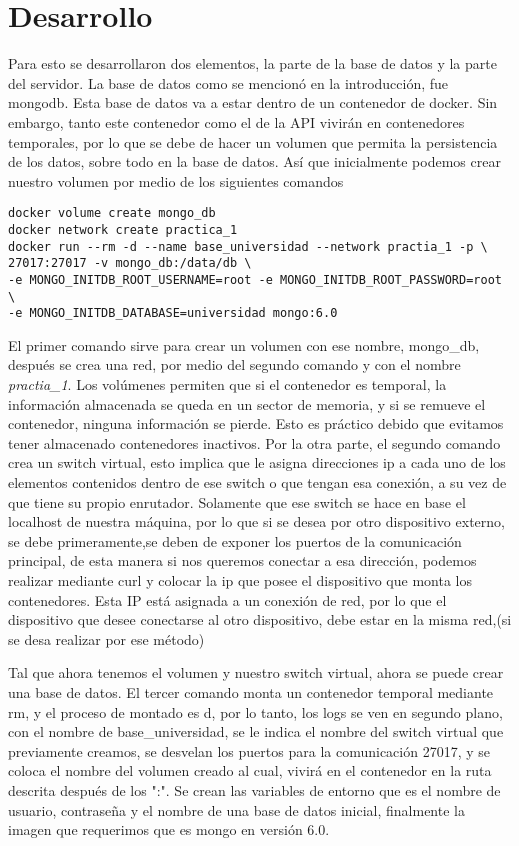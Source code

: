 \documentclass[12pt,a4paper]{report}
\begin{document}
\chapter{Desarrollo}
Para esto se desarrollaron dos elementos, la parte de la base de datos y la parte del servidor. La base de datos como se mencionó en la introducción, fue mongodb. Esta base de datos va a estar dentro de un contenedor de docker. Sin embargo, tanto este contenedor como el de la API vivirán en contenedores temporales, por lo que se debe de hacer un volumen que permita la persistencia de los datos, sobre todo en la base de datos. Así que inicialmente podemos crear nuestro  volumen por medio de los siguientes comandos
\begin{verbatim}
docker volume create mongo_db
docker network create practica_1
docker run --rm -d --name base_universidad --network practia_1 -p \
27017:27017 -v mongo_db:/data/db \
-e MONGO_INITDB_ROOT_USERNAME=root -e MONGO_INITDB_ROOT_PASSWORD=root \
-e MONGO_INITDB_DATABASE=universidad mongo:6.0      
\end{verbatim}
El primer comando sirve para crear un volumen con ese nombre, mongo\_db, después se crea una red, por medio del segundo comando y con el nombre \textit{practia\_1}. Los volúmenes permiten que si el contenedor es temporal, la información almacenada se queda en un sector de memoria, y si se remueve el contenedor, ninguna información se pierde. Esto es práctico debido que evitamos tener almacenado contenedores inactivos. Por la otra parte, el segundo comando crea un switch virtual, esto implica que le asigna direcciones ip a cada uno de los elementos contenidos dentro de ese switch o que tengan esa conexión, a su vez de que tiene su propio enrutador. Solamente que ese switch se hace en base el localhost de nuestra máquina, por lo que si se desea por otro dispositivo externo, se debe primeramente,se deben de exponer los puertos de la comunicación principal, de esta manera si nos queremos conectar a esa dirección, podemos realizar mediante curl y colocar la ip que posee el dispositivo que monta los contenedores. Esta IP está asignada a un conexión de red, por lo que el dispositivo que desee conectarse al otro dispositivo, debe estar en la misma red,(si se desa realizar por ese método)

Tal que ahora tenemos el volumen y nuestro switch virtual, ahora se puede crear una base de datos.
El tercer comando monta un contenedor temporal mediante \-\-rm, y el proceso de montado es \-d, por lo tanto, los logs se ven en segundo plano, con el nombre de base\_universidad, se le indica el nombre del switch virtual que previamente creamos, se desvelan los puertos para la comunicación 27017, y se coloca el nombre del volumen creado al cual, vivirá en el contenedor en la ruta descrita después de los ":". Se crean las variables de entorno que es el nombre de usuario, contraseña y el nombre de una base de datos inicial, finalmente la imagen que requerimos que es mongo en versión 6.0.
\end{document}
